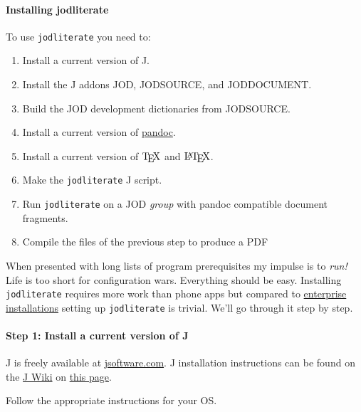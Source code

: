 \documentclass[11pt]{article}
\providecommand{\tightlist}{%
      \setlength{\itemsep}{0pt}\setlength{\parskip}{0pt}}
\let\Oldtex\TeX
\let\Oldlatex\LaTeX
\renewcommand{\TeX}{\textrm{\Oldtex}}
\renewcommand{\LaTeX}{\textrm{\Oldlatex}}
\begin{document}
    \hypertarget{installing-jodliterate}{%
\paragraph{Installing jodliterate}\label{installing-jodliterate}}

To use \texttt{jodliterate} you need to:

\begin{enumerate}
\def\labelenumi{\arabic{enumi}.}
\tightlist
\item
  Install a current version of J.
\item
  Install the J addons JOD, JODSOURCE, and JODDOCUMENT.
\item
  Build the JOD development dictionaries from JODSOURCE.
\item
  Install a current version of \href{https://pandoc.org/}{pandoc}.
\item
  Install a current version of \(\TeX\) and \(\LaTeX\).
\item
  Make the \texttt{jodliterate} J script.
\item
  Run \texttt{jodliterate} on a JOD \emph{group} with pandoc compatible
  document fragments.
\item
  Compile the files of the previous step to produce a PDF
\end{enumerate}

When presented with long lists of program prerequisites my impulse is to
\emph{run!} Life is too short for configuration wars. Everything should
be easy. Installing \texttt{jodliterate} requires more work than phone
apps but compared to
\href{https://www.cio.com/article/2429865/enterprise-resource-planning-10-famous-erp-disasters-dustups-and-disappointments.html}{enterprise
installations} setting up \texttt{jodliterate} is trivial. We'll go
through it step by step.

    \hypertarget{step-1-install-a-current-version-of-j}{%
\paragraph{Step 1: Install a current version of
J}\label{step-1-install-a-current-version-of-j}}

J is freely available at
\href{https://www.jsoftware.com}{jsoftware.com}. J installation
instructions can be found on the
\href{https://code.jsoftware.com/wiki/Main_Page}{J Wiki} on
\href{https://code.jsoftware.com/wiki/System/Installation}{this page}.

Follow the appropriate instructions for your OS.
\end{document}
